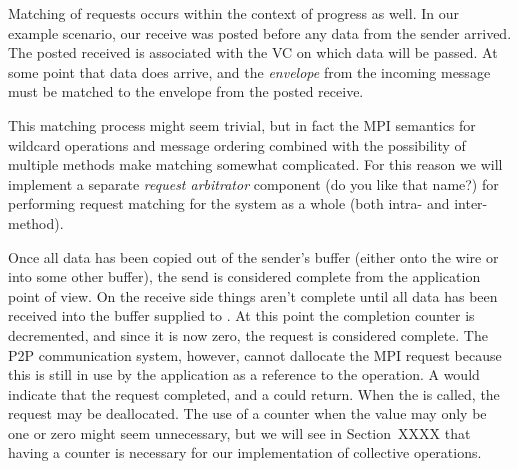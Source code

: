 Matching of requests occurs within the context of progress as well.  In our
example scenario, our receive was posted before any data from the sender
arrived.  The posted received is associated with the VC on which data will be
passed.  At some point that data does arrive, and the \emph{envelope} from
the incoming message must be matched to the envelope from the posted receive.

\begin{comment}
  \emph{define envelope?  point out that it should have been defined?}  briefly
  mention a definition and then point at another section for details (are there
  any details???)
\end{comment}

\begin{comment}
  \emph{we should probably mention message delivery order somewhere.  maybe
    later?}
\end{comment}

This matching process might seem trivial, but in fact the MPI semantics for
wildcard operations and message ordering combined with the possibility of
multiple methods make matching somewhat complicated.
For this reason we will implement a separate \emph{request arbitrator}
component (do you like that name?) for performing request matching for the
system as a whole (both intra- and inter-method).

\begin{comment}
  \emph{arbitrator: does it really arbitrate?  It is a cool sounding word, but
    it seems that ``request matching'' component is more descriptive of what it
    actually does.}
\end{comment}

% 

Once all data has been copied out of the sender's buffer (either onto the wire
or into some other buffer), the send is considered complete from the
application point of view.  On the receive side things aren't complete until
all data has been received into the buffer supplied to .
%
At this point the completion counter is decremented, and since it is now zero,
the request is considered complete.  The P2P communication system, however,
cannot dallocate the MPI request because this is still in use by the
application as a reference to the operation.
%
A  would indicate that
the request completed, and a  could return.
%
When the  is called, the request may be deallocated.
%
The use of a counter when the value may only be one or zero might seem
unnecessary, but we will see in Section~XXXX that having a counter is
necessary for our implementation of collective operations.

